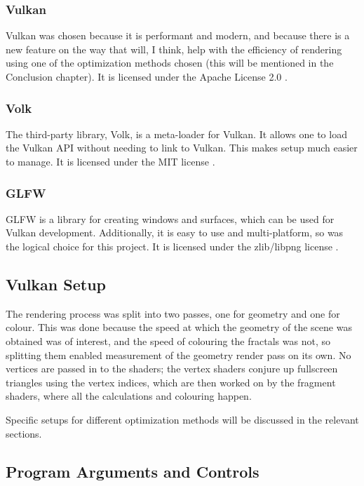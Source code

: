 \subsubsection{Vulkan}

Vulkan was chosen because it is performant and modern, and because there is a new feature on the way that will, I think, help with the efficiency of rendering using one of the optimization methods chosen (this will be mentioned in the Conclusion chapter). It is licensed under the Apache License 2.0 \cite{licensing-vulkan}.

\subsubsection{Volk}

The third-party library, Volk, is a meta-loader for Vulkan. It allows one to load the Vulkan API without needing to link to Vulkan. This makes setup much easier to manage. It is licensed under the MIT license \cite{licensing-volk}.

\subsubsection{GLFW}

GLFW is a library for creating windows and surfaces, which can be used for Vulkan development. Additionally, it is easy to use and multi-platform, so was the logical choice for this project. It is licensed under the zlib/libpng license \cite{licensing-glfw}.

\subsection{Vulkan Setup}

The rendering process was split into two passes, one for geometry and one for colour. This was done because the speed at which the geometry of the scene was obtained was of interest, and the speed of colouring the fractals was not, so splitting them enabled measurement of the geometry render pass on its own. No vertices are passed in to the shaders; the vertex shaders conjure up fullscreen triangles using the vertex indices, which are then worked on by the fragment shaders, where all the calculations and colouring happen.\newline

Specific setups for different optimization methods will be discussed in the relevant sections.

\subsection{Program Arguments and Controls}

